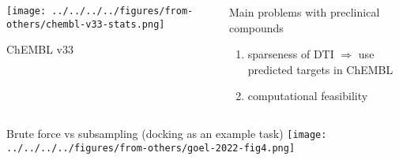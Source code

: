 \documentclass[aspectratio=169]{beamer}
\begin{document}
\begin{frame}
\begin{columns}[t]
\begin{column}{0.5\textwidth}

\texttt{[image: ../../../../figures/from-others/chembl-v33-stats.png]}

{\tiny ChEMBL v33}
\end{column}

\begin{column}{0.5\textwidth}
  \Large

  Main problems with preclinical compounds

\begin{enumerate}
  \item sparseness of DTI $\Rightarrow$ use predicted targets in ChEMBL
  \item computational feasibility
\end{enumerate}


\end{column}
\end{columns}
\end{frame}


\begin{frame}{Brute force vs subsampling (docking as an example task)}
\texttt{[image: ../../../../figures/from-others/goel-2022-fig4.png]}
\end{frame}
\end{document}
